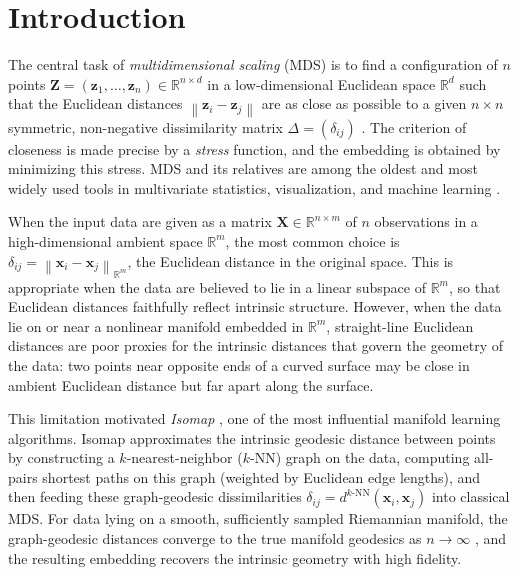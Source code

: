 \documentclass[twoside,11pt]{article}
\newcommand{\R}{\mathbb{R}}
\newcommand{\bx}{\mathbf{x}}
\newcommand{\bX}{\mathbf{X}}
\newcommand{\bz}{\mathbf{z}}
\newcommand{\bZ}{\mathbf{Z}}
\newcommand{\norm}[1]{\left\|#1\right\|}
\newcommand{\dknn}{d^{k\text{-NN}}}
\begin{document}
\section{Introduction}
\label{sec:introduction}

The central task of \emph{multidimensional scaling} (MDS) is to find a
configuration of $n$ points $\bZ = (\bz_1, \ldots, \bz_n) \in \R^{n \times
d}$ in a low-dimensional Euclidean space $\R^d$ such that the Euclidean
distances $\norm{\bz_i - \bz_j}$ are as close as possible to a given $n
\times n$ symmetric, non-negative dissimilarity matrix $\Delta = (\delta_{ij})$
\citep{torgerson1952multidimensional, kruskal1964multidimensional,
borg2005modern, cox2000multidimensional}.  The criterion of closeness is made
precise by a \emph{stress} function, and the embedding is obtained by
minimizing this stress.  MDS and its relatives are among the oldest and most
widely used tools in multivariate statistics, visualization, and machine
learning \citep{shepard1962analysis, sammon1969nonlinear,
vandermaaten2008tsne, mcinnes2018umap}.

When the input data are given as a matrix $\bX \in \R^{n \times m}$ of $n$
observations in a high-dimensional ambient space $\R^m$, the most common
choice is $\delta_{ij} = \norm{\bx_i - \bx_j}_{\R^m}$, the Euclidean
distance in the original space.  This is appropriate when the data are
believed to lie in a linear subspace of $\R^m$, so that Euclidean distances
faithfully reflect intrinsic structure.  However, when the data lie on or
near a nonlinear manifold embedded in $\R^m$, straight-line Euclidean
distances are poor proxies for the intrinsic distances that govern the
geometry of the data: two points near opposite ends of a curved surface
may be close in ambient Euclidean distance but far apart along the surface.

This limitation motivated \emph{Isomap}
\citep{tenenbaum2000global}, one of the most influential manifold learning
algorithms.  Isomap approximates the intrinsic geodesic distance between
points by constructing a $k$-nearest-neighbor ($k$-NN) graph on the data,
computing all-pairs shortest paths on this graph (weighted by Euclidean
edge lengths), and then feeding these graph-geodesic dissimilarities
$\delta_{ij} = \dknn(\bx_i, \bx_j)$ into classical MDS.  For data lying on
a smooth, sufficiently sampled Riemannian manifold, the graph-geodesic
distances converge to the true manifold geodesics as $n \to \infty$
\citep{bernstein2000graph, tenenbaum2000global}, and the resulting embedding
recovers the intrinsic geometry with high fidelity.
\end{document}
